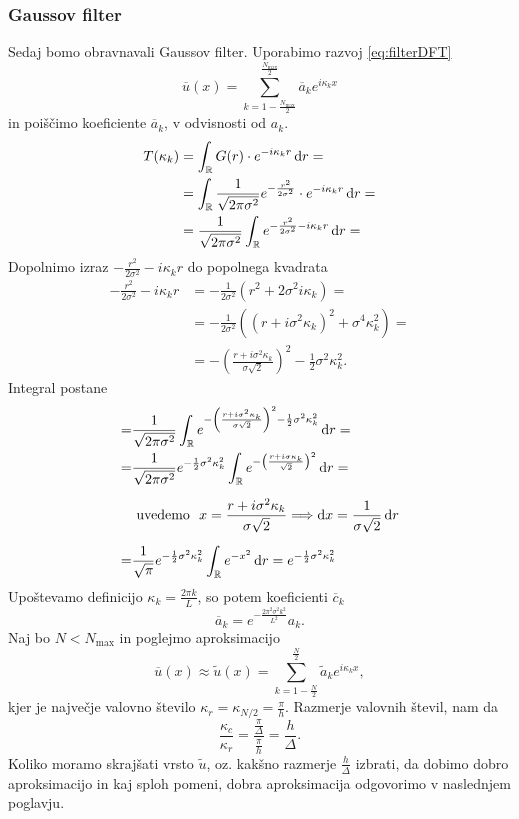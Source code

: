 \documentclass[mat2, tisk]{fmfdelo}
\newcommand{\R}{\mathbb R}
\begin{document}
\subsubsection{Gaussov filter}

Sedaj bomo obravnavali Gaussov filter. Uporabimo razvoj \ref{eq:filterDFT}
$$
\overline{u}(x) = \sum_{k=1 - \frac{N_{\text{max}}}{2}}^\frac{N_{\text{max}}}{2} \overline{a}_k e^{i\kappa_k x}
$$
in poiščimo koeficiente $\overline{a}_k$, v odvisnosti od $a_k$.
\begin{align*}
T(\kappa_k) &= \int_\R G(r) \cdot e^{-i\kappa_k r} \dif r = \\
            &=\int_\R \frac{1}{\sqrt{2\pi \sigma^2}} e^{-\frac{r^2}{2\sigma^2}} \cdot e^{-i\kappa_k r} \dif r = \\
            &= \frac{1}{\sqrt{2\pi \sigma^2}} \int_\R e^{-\frac{r^2}{2\sigma^2} - i\kappa_k r} \dif r = 
\end{align*}
Dopolnimo izraz $-\frac{r^2}{2\sigma^2} - i\kappa_k r$ do popolnega kvadrata
\begin{align*}
-\frac{r^2}{2\sigma^2} - i\kappa_k r &= - \frac{1}{2\sigma^2}(r^2 + 2\sigma^2 i \kappa_k) = \\
&=-\frac{1}{2\sigma^2} ((r + i\sigma^2 \kappa_k)^2  + \sigma^4 \kappa_k^2) = \\
&=- \left(\frac{r + i\sigma^2 \kappa_k}{\sigma\sqrt{2}}\right)^2 - \frac{1}{2} \sigma^2 \kappa_k^2.
\end{align*}
Integral postane 
\begin{align*}
  =& \frac{1}{\sqrt{2\pi \sigma^2}} \int_\R e^{-\left(\frac{r + i\sigma^2 \kappa_k}{\sigma\sqrt{2}}\right)^2 - \frac{1}{2} \sigma^2 \kappa_k^2} \dif r = \\
  =& \frac{1}{\sqrt{2\pi \sigma^2}} e^{ - \frac{1}{2} \sigma^2 \kappa_k^2} \int_\R e^{-\left(\frac{r + i\sigma \kappa_k}{\sqrt{2}}\right)^2} \dif r = \\[2mm]
  &\text{ uvedemo }\,\, x = \frac{r + i\sigma^2 \kappa_k}{\sigma\sqrt{2}} \Longrightarrow \dif x = \frac{1}{\sigma\sqrt{2}} \dif r \\[2mm]
  =& \frac{1}{\sqrt{\pi}} e^{- \frac{1}{2} \sigma^2 \kappa_k^2} \int_\R e^{-x^2} \dif r = e^{- \frac{1}{2} \sigma^2 \kappa_k^2}
\end{align*}
Upoštevamo definicijo $\kappa_k = \frac{2\pi k}{L}$, so potem koeficienti $\overline{c}_k$
\begin{equation}
  \overline{a}_k = e^{-\frac{2\pi^2 \sigma^2 k^2}{L^2}} a_k.
\end{equation}
Naj bo $N < N_\text{max}$ in poglejmo aproksimacijo
\begin{equation}
\overline{u}(x) \approx \tilde{u}(x) = \sum_{k=1 - \frac{N}{2}}^\frac{N}{2} \tilde{a}_k e^{i\kappa_k x},
\end{equation}
kjer je največje valovno število $\kappa_r = \kappa_{N/2} = \frac{\pi}{h}$. Razmerje valovnih števil,
nam da 
$$
\frac{\kappa_c}{\kappa_r} = \frac{\frac{\pi}{\Delta}}{\frac{\pi}{h}} = \frac{h}{\Delta}.
$$
Koliko moramo skrajšati vrsto $\tilde{u}$, oz. kakšno razmerje $\frac{h}{\Delta}$ izbrati, da 
dobimo dobro aproksimacijo in kaj sploh pomeni, dobra aproksimacija 
odgovorimo v naslednjem poglavju. 
\end{document}
